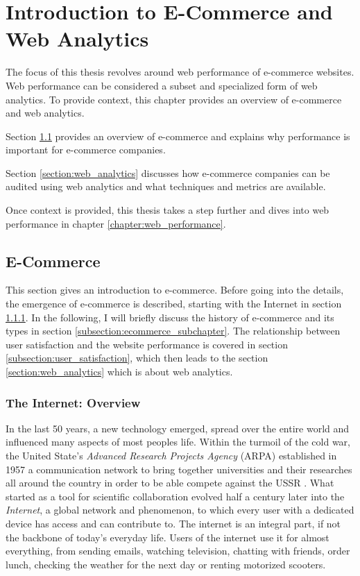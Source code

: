 
\chapter{Introduction to E-Commerce and Web Analytics} %

The focus of this thesis revolves around web performance of e-commerce websites.
Web performance can be considered a subset and specialized form of web analytics.
To provide context, this chapter provides an overview of e-commerce and web analytics.

Section \ref{section:e-commerce} provides an overview of e-commerce and explains why performance is important for e-commerce companies.

Section \ref{section:web_analytics} discusses how e-commerce companies can be audited using web analytics and what techniques and metrics are available.

Once context is provided, this thesis takes a step further and dives into web performance in chapter \ref{chapter:web_performance}.




\section{E-Commerce} %
\label{section:e-commerce}

This section gives an introduction to e-commerce.
Before going into the details, the emergence of e-commerce is described, starting with the Internet in section \ref{subsection:internet}.
In the following, I will briefly discuss the history of e-commerce and its types in section \ref{subsection:ecommerce_subchapter}.
The relationship between user satisfaction and the website performance is covered in section \ref{subsection:user_satisfaction}, which then leads to the section \ref{section:web_analytics} which is about web analytics.



\subsection{The Internet: Overview} %
\label{subsection:internet}

In the last 50 years, a new technology emerged, spread over the entire world and influenced many aspects of most peoples life.
Within the turmoil of the cold war, the United State's \textit{Advanced Research Projects Agency} (ARPA) established in 1957 a communication network to bring together universities and their researches all around the country in order to be able compete against the USSR \cite{2011Cohen}.
What started as a tool for scientific collaboration evolved half a century later into the \textit{Internet}, a global network and phenomenon, to which every user with a dedicated device has access and can contribute to.
The internet is an integral part, if not the backbone of today's everyday life.
Users of the internet use it for almost everything, from sending emails, watching television, chatting with friends, order lunch, checking the weather for the next day or renting motorized scooters.

